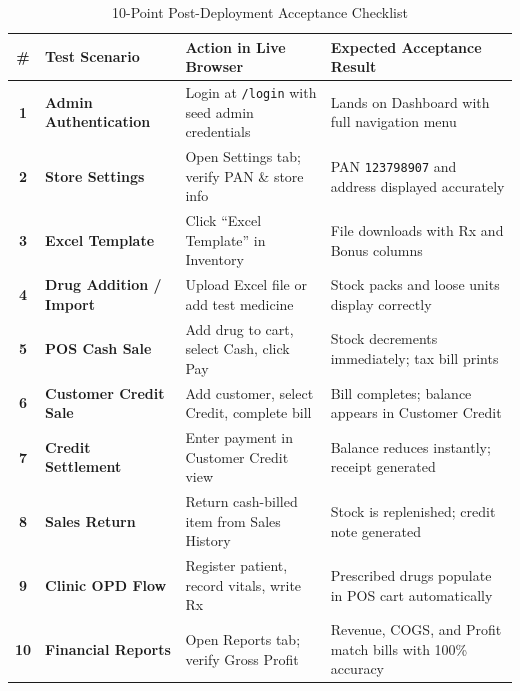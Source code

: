 \documentclass[10pt,a4paper]{article}
\begin{document}
\begin{table}[h!]
\centering
\small
\begin{tabularx}{\textwidth}{>{\bfseries\color{NavyDark}}c>{\bfseries\color{NavyDark}}p{3.2cm}p{4.4cm}X}
\toprule
\rowcolor{NavyDark}
\color{white}\# & \color{white}Test Scenario & \color{white}Action in Live Browser & \color{white}Expected Acceptance Result \\
\midrule
1 & Admin Authentication & Login at \texttt{/login} with seed admin credentials & Lands on Dashboard with full navigation menu \\
\rowcolor{SlateLight}
2 & Store Settings & Open Settings tab; verify PAN \& store info & PAN \texttt{123798907} and address displayed accurately \\
3 & Excel Template & Click ``Excel Template'' in Inventory & File downloads with Rx and Bonus columns \\
\rowcolor{SlateLight}
4 & Drug Addition / Import & Upload Excel file or add test medicine & Stock packs and loose units display correctly \\
5 & POS Cash Sale & Add drug to cart, select Cash, click Pay & Stock decrements immediately; tax bill prints \\
\rowcolor{SlateLight}
6 & Customer Credit Sale & Add customer, select Credit, complete bill & Bill completes; balance appears in Customer Credit \\
7 & Credit Settlement & Enter payment in Customer Credit view & Balance reduces instantly; receipt generated \\
\rowcolor{SlateLight}
8 & Sales Return & Return cash-billed item from Sales History & Stock is replenished; credit note generated \\
9 & Clinic OPD Flow & Register patient, record vitals, write Rx & Prescribed drugs populate in POS cart automatically \\
\rowcolor{SlateLight}
10 & Financial Reports & Open Reports tab; verify Gross Profit & Revenue, COGS, and Profit match bills with 100\% accuracy \\
\bottomrule
\end{tabularx}
\caption{10-Point Post-Deployment Acceptance Checklist}
\end{table}

\newpage

\end{document}
